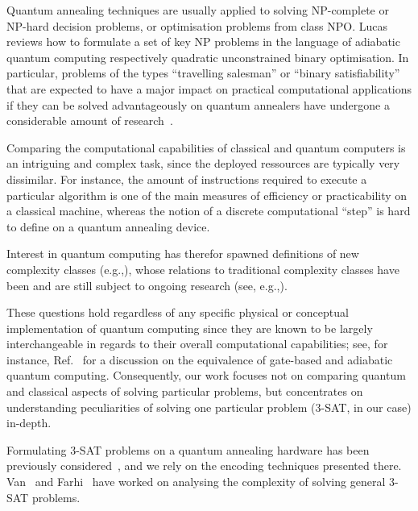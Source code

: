 Quantum annealing techniques are usually applied to solving NP-complete or NP-hard decision problems, or optimisation problems from class NPO. Lucas~\cite{lucas2014ising} reviews how to formulate a set of key NP problems in the language of adiabatic quantum computing respectively quadratic unconstrained binary optimisation. In particular, problems of the types ``travelling salesman'' or ``binary satisfiability'' that are expected to have a major impact on practical computational applications if they can be solved advantageously on quantum annealers have undergone a considerable amount of research~\cite{heim2017designing,warren2017small,moylett2017quantum,strand2017zzz,benjamin2017measurement}.

Comparing the computational capabilities of classical and quantum computers
is an intriguing and complex task, since the deployed ressources are typically very dissimilar. For instance, the amount of instructions required
to execute a particular algorithm is one of the main measures of efficiency
or practicability on a classical machine, whereas the notion of a discrete
computational ``step'' is hard to define on a quantum annealing device.

Interest in quantum computing has therefor spawned definitions of new complexity classes (e.g.,\cite{klauck2017complexity,morimae2017merlinization}), whose relations to traditional complexity classes have been and are still subject to ongoing research (see, e.g.,\cite{bernstein1997quantum,marriott2005quantum}).


These questions hold regardless of any specific physical or conceptual implementation of quantum computing since they are known to be largely interchangeable in regards to their overall computational capabilities; see, for instance, Ref.~\cite{mcgeoch2014adiabatic} for a discussion on the
equivalence of gate-based and adiabatic quantum computing. Consequently,
our work focuses not on comparing quantum and classical aspects of solving particular problems, but concentrates on understanding peculiarities
of solving one particular problem (3-SAT, in our case) in-depth.

Formulating 3-SAT problems on a quantum annealing hardware has been previously considered~\cite{choi2011different,choi2010adiabatic,farhi2000quantum}, and we rely on the encoding techniques presented there. Van~\cite{van2001powerful} and Farhi~\cite{farhi2009quantum} have worked on analysing the complexity of solving general 3-SAT problems.
